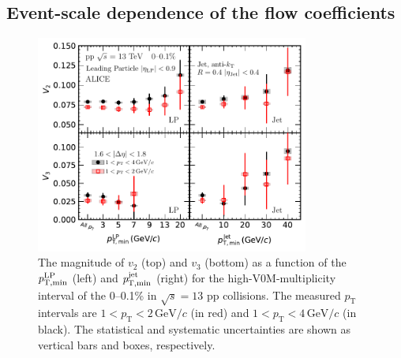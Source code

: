 \subsection{Event-scale dependence of the flow coefficients}
\begin{figure}[h!]
	\centering
	\hspace{-3em}\includegraphics[width=0.8\textwidth]{figures/FIG6_vn_LP.pdf}
	\caption{The magnitude of $v_2$ (top) and $v_3$ (bottom) as a function of the $\it{p}^{\rm{LP}}_{\rm{T,min}}$ (left) and $\it{p}^{\rm{jet}}_{\rm{T,min}}$ (right) for the high-V0M-multiplicity interval of the 0--0.1\% in $\sqrt{s}=13$ pp collisions. The measured $p_{\mathrm{T}}$ intervals are $1<p_{\mathrm{T}}<2\,\mathrm{GeV}/c$ (in red) and $1<p_{\mathrm{T}}<4\,\mathrm{GeV}/c$ (in black). The statistical and systematic uncertainties are shown as vertical bars and boxes, respectively.}
	\label{fig:LPjet23}
\end{figure}    

